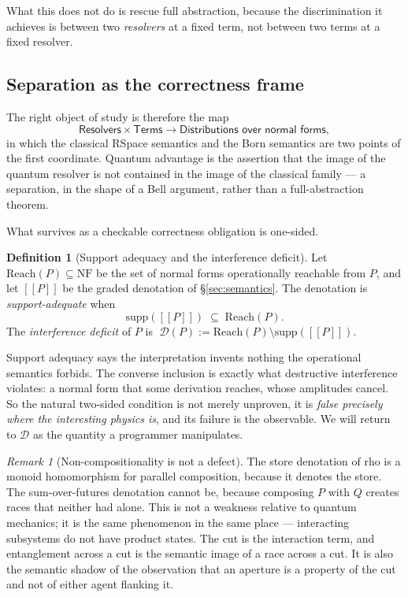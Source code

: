 \documentclass[11pt,a4paper]{article}
\theoremstyle{plain}
\theoremstyle{definition}
\newtheorem{definition}[theorem]{Definition}
\theoremstyle{remark}
\newtheorem{remark}[theorem]{Remark}
\newcommand{\sem}[1]{[\![#1]\!]}
\newcommand{\NF}{\mathrm{NF}}
\newcommand{\Reach}{\mathrm{Reach}}
\newcommand{\supp}{\mathrm{supp}}
\begin{document}
What this does not do is rescue full abstraction, because the discrimination it
achieves is between two \emph{resolvers} at a fixed term, not between two terms
at a fixed resolver.

\subsection{Separation as the correctness frame}

The right object of study is therefore the map
\[
  \textsf{Resolvers} \times \textsf{Terms} \longrightarrow \textsf{Distributions
  over normal forms},
\]
in which the classical RSpace semantics and the Born semantics are two points of
the first coordinate. Quantum advantage is the assertion that the image of the
quantum resolver is not contained in the image of the classical family --- a
separation, in the shape of a Bell argument, rather than a full-abstraction
theorem.

What survives as a checkable correctness obligation is one-sided.

\begin{definition}[Support adequacy and the interference deficit]\label{def:deficit}
Let $\Reach(P) \subseteq \NF$ be the set of normal forms operationally reachable
from $P$, and let $\sem{P}$ be the graded denotation of \S\ref{sec:semantics}.
The denotation is \emph{support-adequate} when
\[
  \supp(\sem{P}) \;\subseteq\; \Reach(P).
\]
The \emph{interference deficit} of $P$ is
$\;\mathcal{D}(P) := \Reach(P)\setminus\supp(\sem{P})$.
\end{definition}

Support adequacy says the interpretation invents nothing the operational
semantics forbids. The converse inclusion is exactly what destructive
interference violates: a normal form that some derivation reaches, whose
amplitudes cancel. So the natural two-sided condition is not merely unproven, it
is \emph{false precisely where the interesting physics is}, and its failure is
the observable. We will return to $\mathcal{D}$ as the quantity a programmer
manipulates.

\begin{remark}[Non-compositionality is not a defect]\label{rem:compositional}
The store denotation of rho is a monoid homomorphism for parallel composition,
because it denotes the store. The sum-over-futures denotation cannot be, because
composing $P$ with $Q$ creates races that neither had alone. This is not a
weakness relative to quantum mechanics; it is the same phenomenon in the same
place --- interacting subsystems do not have product states. The cut is the
interaction term, and entanglement across a cut is the semantic image of a race
across a cut. It is also the semantic shadow of the observation that an aperture
is a property of the cut and not of either agent flanking it.
\end{remark}
\end{document}
